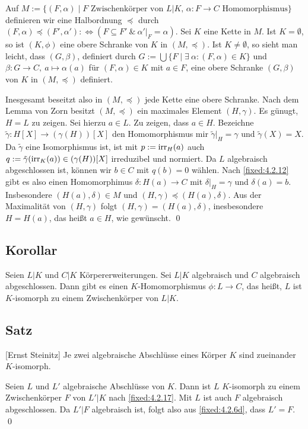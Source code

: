 \proof Auf $M := \{(F,\alpha) \mid \text{$F$ Zwischenkörper von $L|K$, $\alpha : F \to C$ Homomorphismus}\}$ definieren wir eine Halbordnung $\preceq$ durch $(F,\alpha) \preceq (F',\alpha') :\iff (F \subseteq F'~\&~\alpha'|_F = \alpha)$. Sei $K$ eine Kette in $M$. Ist $K = \emptyset$, so ist $(K, \phi)$ eine obere Schranke von $K$ in $(M,\preceq)$. Ist $K \neq \emptyset$, so sieht man leicht, dass  $(G,\beta)$, definiert durch $G := \bigcup\{F \mid \exists~\alpha : (F,\alpha) \in K\}$ und $\beta : G \to C,~a \mapsto \alpha(a)$ für $(F,\alpha) \in K$ mit $a \in F$, eine obere Schranke $(G,\beta)$ von $K$ in $(M,\preceq)$ definiert.

Inesgesamt beseitzt also in $(M,\preceq)$ jede Kette eine obere Schranke. Nach dem Lemma von Zorn besitzt $(M,\preceq)$ ein maximales Element $(H,\gamma)$. Es günugt, $H=L$ zu zeigen. Sei hierzu $a \in L$. Zu zeigen, dass $a \in H$. Bezeichne $\tilde \gamma : H[X] \to (\gamma(H))[X]$ den Homomorphismus mir $\tilde \gamma|_H = \gamma$ und $\tilde \gamma(X)=X$. Da $\tilde \gamma$ eine Isomorphismus ist, ist mit $p := \operatorname{irr}_H(a)$ auch $q := \tilde \gamma(\operatorname{irr}_K(a)) \in (\gamma(H))[X]$ irreduzibel und normiert. Da $L$ algebraisch abgeschlossen ist, können wir $b \in C$ mit $q(b) = 0$ wählen. Nach \ref{fixed:4.2.12} gibt es also einen Homomorphimus $\delta:H(a) \to C$ mit $\delta|_H = \gamma$ und $\delta(a) = b$. Insbesondere $(H(a),\delta) \in M$ und $(H,\gamma) \preceq (H(a), \delta)$. Aus der Maximalität von $(H,\gamma)$ folgt $(H,\gamma) = (H(a),\delta)$, inesbesondere $H = H(a)$, das heißt $a \in H$, wie gewünscht. \qed

\subsection{Korollar} Seien $L|K$ und $C|K$ Körpererweiterungen. Sei $L|K$ algebraisch und $C$ algebraisch abgeschlossen. Dann gibt es einen $K$-Homomorphismus $\phi:L \to C$, das heißt, $L$ ist $K$-isomorph zu einem Zwischenkörper von $L|K$.

\subsection{Satz} [Ernst Steinitz] Je zwei algebraische Abschlüsse eines Körper $K$ sind zueinander $K$-isomorph. 

\proof Seien $L$ und $L'$ algebraische Abschlüsse von $K$. Dann ist $L$ $K$-isomorph zu einem Zwischenkörper $F$ von $L'|K$ nach \ref{fixed:4.2.17}. Mit $L$ ist auch $F$ algebraisch abgeschlossen. Da $L'|F$ algebraisch ist, folgt also aus \ref{fixed:4.2.6d}, dass $L'=F$. \qed

